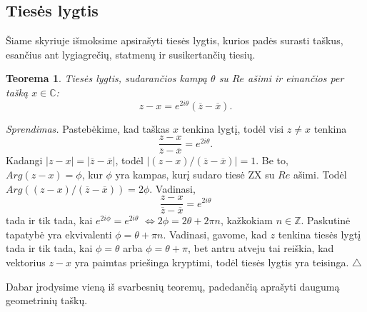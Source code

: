 \documentclass[11pt,a4paper,twoside]{book}
\newenvironment{sprendimas}{\noindent \textit{Sprendimas.}}{\hfill $\triangle$}
\newtheorem{thmnr}{Teorema}
\theoremstyle{definition} \newtheorem*{api}{Apibrėžimas}
\theoremstyle{remark} \newtheorem*{pastaba}{Pastaba}
\begin{document}
\subsection*{Tiesės lygtis}

Šiame skyriuje išmoksime apsirašyti tiesės lygtis, kurios padės surasti taškus, esančius ant lygiagrečių, statmenų ir susikertančių tiesių.

\begin{thmnr}
Tiesės lygtis, sudarančios kampą $\theta$ su $Re$ ašimi ir einančios per tašką $x \in \mathbb{C}$: $$z-x=e^{2i\theta}(\overline{z}-\overline{x}).$$
\end{thmnr}
\begin{sprendimas}
Pastebėkime, kad taškas $x$ tenkina lygtį, todėl visi $ z \neq x$ tenkina $$\frac{z-x}{\overline{z}-\overline{x}}=e^{2i\theta}.$$ Kadangi $|z-x|=|\overline{z}-\overline{x}|$, todėl $|(z-x)/(\overline{z}-\overline{x})|=1$. Be to, $Arg (z-x) =\phi$, kur $\phi$ yra kampas, kurį sudaro tiesė ZX su $Re$ ašimi. Todėl $Arg ((z-x)/(\overline{z}-\overline{x})) =2\phi$. Vadinasi, 
$$\frac{z-x}{\overline{z}-\overline{x}}=e^{2i\theta}$$ tada ir tik tada, kai $e^{2i\phi}=e^{2i\theta}$ $\Leftrightarrow 2\phi =2\theta + 2\pi n$, kažkokiam $n \in \mathbb{Z}.$ Paskutinė tapatybė yra ekvivalenti $\phi = \theta + \pi n$. Vadinasi, gavome, kad $z$ tenkina tiesės lygtį tada ir tik tada, kai $\phi = \theta$ arba $\phi = \theta + \pi$, bet antru atveju tai reiškia, kad vektorius $z-x$ yra paimtas priešinga kryptimi, todėl tiesės lygtis yra teisinga.
\end{sprendimas}




\bigskip
Dabar įrodysime vieną iš svarbesnių teoremų, padedančią aprašyti daugumą geometrinių taškų.
\end{document}
